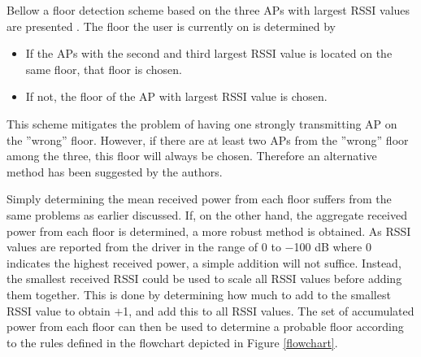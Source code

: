 \documentclass{LTHthesis}
\begin{document}
Bellow a floor detection scheme based on the three APs with largest RSSI values are presented \cite{floor_det}. The floor the user is currently on is determined by 
%
\begin{itemize}
\item If the APs with the second and third largest RSSI value is located on the same floor, that floor is chosen.
\item If not, the floor of the AP with largest RSSI value is chosen.   
\end{itemize}      
%
This scheme mitigates the problem of having one strongly transmitting AP on the ''wrong'' floor. However, if there are at least two APs from the ''wrong'' floor among the three, this floor will always be chosen. Therefore an alternative method has been suggested by the authors. 

Simply determining the mean received power from each floor suffers from the same problems as earlier discussed. If, on the other hand, the aggregate received power from each floor is determined, a more robust method is obtained. As RSSI values are reported from the driver in the range of 0 to $-$100 dB where 0 indicates the highest received power, a simple addition will not suffice. Instead, the smallest received RSSI could be used to scale all RSSI values before adding them together. This is done by determining how much to add to the smallest RSSI value to obtain $+$1, and add this to all RSSI values. The set of accumulated power from each floor can then be used to determine a probable floor according to the rules defined in the flowchart depicted in Figure \ref{flowchart}.
\end{document}
